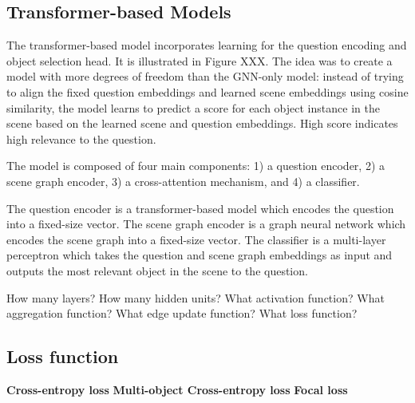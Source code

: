 \subsection{Transformer-based Models}

The transformer-based model incorporates learning for the question encoding and object selection head. It is illustrated in Figure XXX. The idea was to create a model with more degrees of freedom than the GNN-only model: instead of trying to align the fixed question embeddings and learned scene embeddings using cosine similarity, the model learns to predict a  score for each object instance in the scene based on the learned scene and question embeddings. High score indicates high relevance to the question.

The model is composed of four main components: 1) a question encoder, 2) a scene graph encoder, 3) a cross-attention mechanism, and 4) a classifier.

The question encoder is a transformer-based model which encodes the question into a fixed-size vector. The scene graph encoder is a graph neural network which encodes the scene graph into a fixed-size vector. The classifier is a multi-layer perceptron which takes the question and scene graph embeddings as input and outputs the most relevant object in the scene to the question.

How many layers? How many hidden units? What activation function? What aggregation function? What edge update function? What loss function?

\subsection{Loss function}

\textbf{Cross-entropy loss}
\textbf{Multi-object Cross-entropy loss}
\textbf{Focal loss}